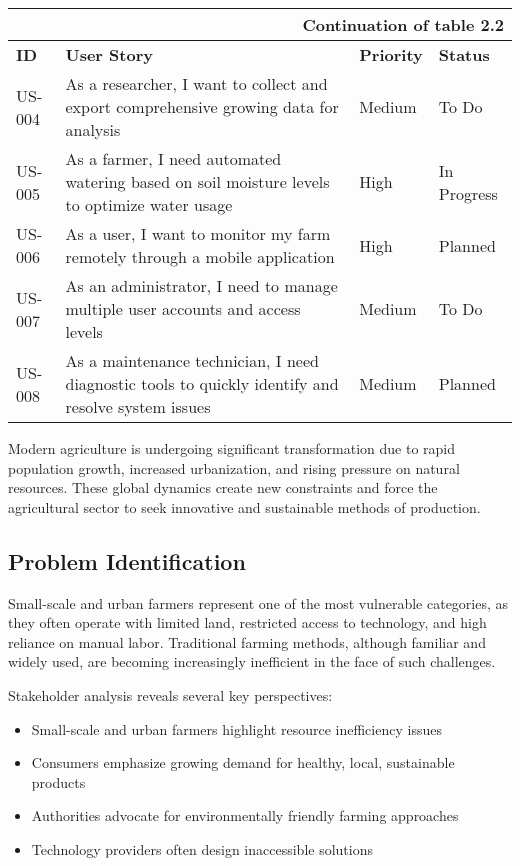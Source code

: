 \begin{longtable}{|p{}|p{}|p{}|p{}|}
\multicolumn{4}{r}{\textbf{\normalsize{Continuation of table 2.2}}} \\
\hline
\textbf{ID} & \textbf{User Story} & \textbf{Priority} & \textbf{Status} \\
\hline
US-004 & As a researcher, I want to collect and export comprehensive growing data for analysis & Medium & To Do \\
\hline
US-005 & As a farmer, I need automated watering based on soil moisture levels to optimize water usage & High & In Progress \\
\hline
US-006 & As a user, I want to monitor my farm remotely through a mobile application & High & Planned \\
\hline
US-007 & As an administrator, I need to manage multiple user accounts and access levels & Medium & To Do \\
\hline
US-008 & As a maintenance technician, I need diagnostic tools to quickly identify and resolve system issues & Medium & Planned \\
\hline
\end{longtable}

Modern agriculture is undergoing significant transformation due to rapid population growth, increased urbanization, and rising pressure on natural resources. These global dynamics create new constraints and force the agricultural sector to seek innovative and sustainable methods of production.

\subsection{Problem Identification}

Small-scale and urban farmers represent one of the most vulnerable categories, as they often operate with limited land, restricted access to technology, and high reliance on manual labor. Traditional farming methods, although familiar and widely used, are becoming increasingly inefficient in the face of such challenges.

Stakeholder analysis reveals several key perspectives:
\begin{itemize}
\item Small-scale and urban farmers highlight resource inefficiency issues
\item Consumers emphasize growing demand for healthy, local, sustainable products
\item Authorities advocate for environmentally friendly farming approaches
\item Technology providers often design inaccessible solutions
\end{itemize}

